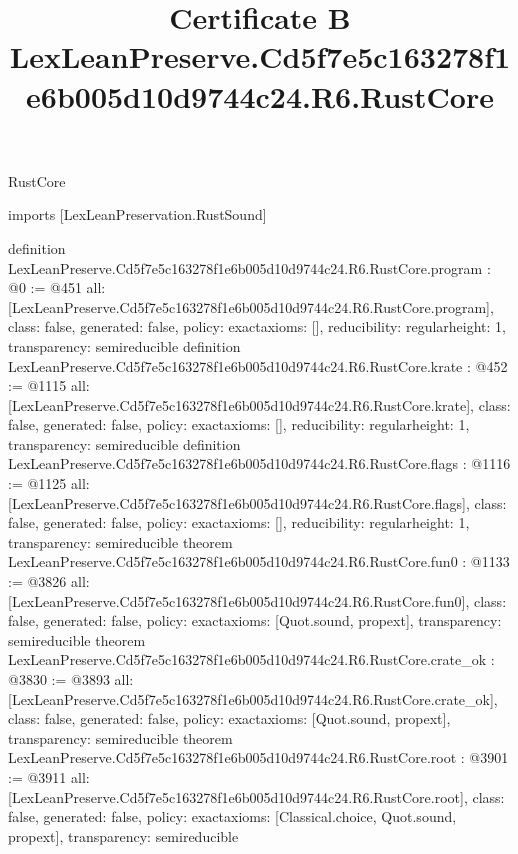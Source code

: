 \begin{lexlean}{RustCore}
\title{Certificate B LexLeanPreserve.Cd5f7e5c163278f1e6b005d10d9744c24.R6.RustCore}
\begin{coremodule}
imports [LexLeanPreservation.RustSound]

definition LexLeanPreserve.Cd5f7e5c163278f1e6b005d10d9744c24.R6.RustCore.program : @0 := @451 {
  all: [LexLeanPreserve.Cd5f7e5c163278f1e6b005d10d9744c24.R6.RustCore.program],
  class: false,
  generated: false,
  policy: exact{axioms: []},
  reducibility: regular{height: 1},
  transparency: semireducible
}
definition LexLeanPreserve.Cd5f7e5c163278f1e6b005d10d9744c24.R6.RustCore.krate : @452 := @1115 {
  all: [LexLeanPreserve.Cd5f7e5c163278f1e6b005d10d9744c24.R6.RustCore.krate],
  class: false,
  generated: false,
  policy: exact{axioms: []},
  reducibility: regular{height: 1},
  transparency: semireducible
}
definition LexLeanPreserve.Cd5f7e5c163278f1e6b005d10d9744c24.R6.RustCore.flags : @1116 := @1125 {
  all: [LexLeanPreserve.Cd5f7e5c163278f1e6b005d10d9744c24.R6.RustCore.flags],
  class: false,
  generated: false,
  policy: exact{axioms: []},
  reducibility: regular{height: 1},
  transparency: semireducible
}
theorem LexLeanPreserve.Cd5f7e5c163278f1e6b005d10d9744c24.R6.RustCore.fun0 : @1133 := @3826 {
  all: [LexLeanPreserve.Cd5f7e5c163278f1e6b005d10d9744c24.R6.RustCore.fun0],
  class: false,
  generated: false,
  policy: exact{axioms: [Quot.sound, propext]},
  transparency: semireducible
}
theorem LexLeanPreserve.Cd5f7e5c163278f1e6b005d10d9744c24.R6.RustCore.crate_ok : @3830 := @3893 {
  all: [LexLeanPreserve.Cd5f7e5c163278f1e6b005d10d9744c24.R6.RustCore.crate_ok],
  class: false,
  generated: false,
  policy: exact{axioms: [Quot.sound, propext]},
  transparency: semireducible
}
theorem LexLeanPreserve.Cd5f7e5c163278f1e6b005d10d9744c24.R6.RustCore.root : @3901 := @3911 {
  all: [LexLeanPreserve.Cd5f7e5c163278f1e6b005d10d9744c24.R6.RustCore.root],
  class: false,
  generated: false,
  policy: exact{axioms: [Classical.choice, Quot.sound, propext]},
  transparency: semireducible
}


\end{coremodule}
\end{lexlean}
